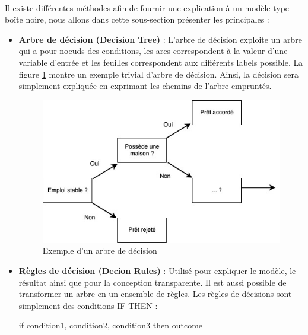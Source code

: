 \paragraph{}Il existe différentes méthodes afin de fournir une explication à un modèle type boîte noire, nous allons dans cette sous-section présenter les principales :
\begin{itemize}
    \item \textbf{Arbre de décision (Decision Tree)} : L'arbre de décision exploite un arbre qui a pour noeuds des conditions, les arcs correspondent à la valeur d'une variable d'entrée et les feuilles correspondent aux différents labels possible. La figure \ref{decision_tree} montre un exemple trivial d'arbre de décision. Ainsi, la décision sera simplement expliquée en exprimant les chemins de l'arbre empruntés. 

    \begin{figure}[h]
    \centering
    \includegraphics[scale=0.5]{src_img/decision_tree.jpg}
    \caption{Exemple d'un arbre de décision}
    \label{decision_tree}
    \end{figure}
    
    \item \textbf{Règles de décision (Decion Rules)} : Utilisé pour expliquer le modèle, le résultat ainsi que pour la conception transparente. Il est aussi possible de transformer un arbre en un ensemble de règles. Les règles de décisions sont simplement des conditions IF-THEN : 
    
    if condition1, condition2, condition3 then outcome 
    

\end{itemize}
